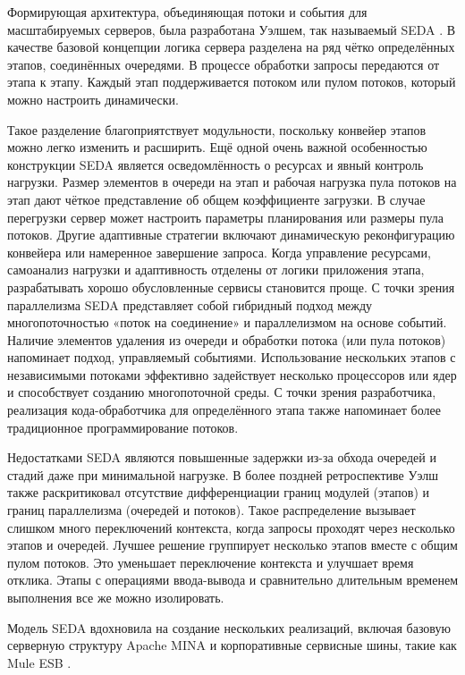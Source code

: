 Формирующая архитектура, объединяющая потоки и события для масштабируемых серверов, была разработана Уэлшем, так называемый SEDA \cite{seda}. В качестве базовой концепции логика сервера разделена на ряд чётко определённых этапов, соединённых очередями. В процессе обработки запросы передаются от этапа к этапу. Каждый этап поддерживается потоком или пулом потоков, который можно настроить динамически.

Такое разделение благоприятствует модульности, поскольку конвейер этапов можно легко изменить и расширить. Ещё одной очень важной особенностью конструкции SEDA является осведомлённость о ресурсах и явный контроль нагрузки. Размер элементов в очереди на этап и рабочая нагрузка пула потоков на этап дают чёткое представление об общем коэффициенте загрузки. В случае перегрузки сервер может настроить параметры планирования или размеры пула потоков. Другие адаптивные стратегии включают динамическую реконфигурацию конвейера или намеренное завершение запроса. Когда управление ресурсами, самоанализ нагрузки и адаптивность отделены от логики приложения этапа, разрабатывать хорошо обусловленные сервисы становится проще. С точки зрения параллелизма SEDA представляет собой гибридный подход между многопоточностью «поток на соединение» и параллелизмом на основе событий. Наличие элементов удаления из очереди и обработки потока (или пула потоков) напоминает подход, управляемый событиями. Использование нескольких этапов с независимыми потоками эффективно задействует несколько процессоров или ядер и способствует созданию многопоточной среды. С точки зрения разработчика, реализация кода-обработчика для определённого этапа также напоминает более традиционное программирование потоков.

Недостатками SEDA являются повышенные задержки из-за обхода очередей и стадий даже при минимальной нагрузке. В более поздней ретроспективе Уэлш также раскритиковал отсутствие дифференциации границ модулей (этапов) и границ параллелизма (очередей и потоков). Такое распределение вызывает слишком много переключений контекста, когда запросы проходят через несколько этапов и очередей. Лучшее решение группирует несколько этапов вместе с общим пулом потоков. Это уменьшает переключение контекста и улучшает время отклика. Этапы с операциями ввода-вывода и сравнительно длительным временем выполнения все же можно изолировать.

Модель SEDA вдохновила на создание нескольких реализаций, включая базовую серверную структуру Apache MINA \cite{mina} и корпоративные сервисные шины, такие как Mule ESB \cite{mulesoft}.

